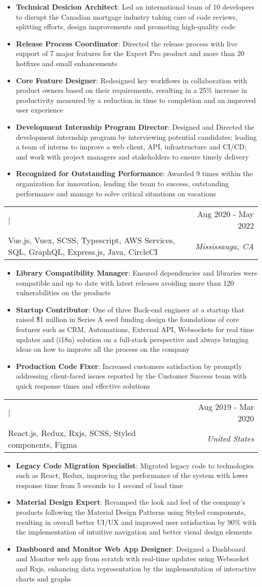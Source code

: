 \documentclass[letterpaper,10.8pt]{article}
\makeatletter
\newcommand{\normalFont}[1]{\fontsize{9.5pt}{11pt}{\selectfont{#1}}}
\newcommand{\largeFont}[1]{\fontsize{11pt}{11pt}{\selectfont{#1}}}
\newcommand{\resumeItem}[2]{
  \item{
      \small\textbf{#1}{: #2 \vspace{-4pt}}
    }
  }
\newcommand{\resumeSubheading}[5]{
    \begin{tabular*}{1\textwidth}{l@{\extracolsep{\fill}}r}
      \largeFont{\textbf{#1}} | \normalFont{#3} & \small{#4} \\
      {\normalFont{Stack: } #5} & \textit{\small #2} \\
    \end{tabular*}\vspace{-8pt}
  }
\newcommand{\resumeItemListStart}{\begin{itemize}}
\newcommand{\resumeItemListEnd}{\end{itemize}\vspace{4pt}}
\makeatother
\begin{document}
\resumeItemListStart
\resumeItem{Technical Desicion Architect}
{Led an international team of 10 developers to disrupt the Canadian mortgage industry taking care of code reviews, splitting efforts, design improvements and promoting high-quality code}
\resumeItem{Release Process Coordinator}
{Directed the release process with live support of 7 major features for the Expert Pro product and more than 20 hotfixes and small enhancements}
\resumeItem{Core Feature Designer}{Redesigned key workflows in collaboration with product owners based on their requirements, resulting in a 25\% increase in productivity measured by a reduction in time to completion and an improved user experience}
\resumeItem{Development Internship Program Director}{Designed and Directed the development internship program by interviewing potential candidates; leading a team of interns to improve a web client, API, infrastructure and CI/CD; and work with project managers and stakeholders to ensure timely delivery}
\resumeItem{Recognized for Outstanding Performance}{Awarded 9 times within the organization for innovation, leading the team to success, outstanding performance and manage to solve critical situations on vacations}
\resumeItemListEnd

\resumeSubheading
{Founding Software Engineer}{Mississauga, CA}
{Doorr (acquired by Finastra)}{Aug 2020 -  May 2022}
{Vue.js, Vuex, SCSS, Typescript, AWS Services, SQL, GraphQL, Express.js, Java, CircleCI}

\resumeItemListStart
\resumeItem{Library Compatibility Manager}
{Ensured dependencies and libraries were compatible and up to date with latest releases avoiding more than 120 vulnerabilities on the products}
\resumeItem{Startup Contributor}
{One of three Back-end engineer at a startup that raised \~\$1 million in Series A seed funding design the foundations of core features such as CRM, Automations, External API, Websockets for real time updates and (i18n) solution on a full-stack perspective and always bringing ideas on how to improve all the process on the company}
\resumeItem{Production Code Fixer}
{Increased customers satisfaction by promptly addressing client-faced issues reported by the Customer Success team with quick response times and effective solutions}
\resumeItemListEnd

\resumeSubheading
{Frontend Developer}{United States}
{Telesero}{Aug 2019 - Mar 2020}
{React.js, Redux, Rxjs, SCSS, Styled components, Figma}

\resumeItemListStart
\resumeItem{Legacy Code Migration Specialist}
{Migrated legacy code to technologies such as React, Redux, improving the performance of the system with lower response time from 5 seconds to 1 second of load time }
\resumeItem{Material Design Expert}
{Revamped the look and feel of the company’s products following the Material Design Patterns using Styled components, resulting in overall better UI/UX and improved user satisfaction by 90\% with the implementation of intuitive navigation and better visual design elements }
\resumeItem{Dashboard and Monitor Web App Designer}
{Designed a Dashboard and Monitor web app from scratch with real-time updates using Websocket and Rxjs, enhancing data representation by the implementation of interactive charts and graphs}
\resumeItemListEnd
\end{document}
